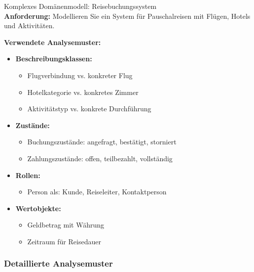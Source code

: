 \begin{example2}{Komplexes Domänenmodell: Reisebuchungssystem}\\
    \small
\textbf{Anforderung:} Modellieren Sie ein System für Pauschalreisen mit Flügen, Hotels und Aktivitäten.

\textbf{Verwendete Analysemuster:}
\begin{itemize}
    \item \textbf{Beschreibungsklassen:}
    \begin{itemize}
        \item Flugverbindung vs. konkreter Flug
        \item Hotelkategorie vs. konkretes Zimmer
        \item Aktivitätstyp vs. konkrete Durchführung
    \end{itemize}
    
    \item \textbf{Zustände:}
    \begin{itemize}
        \item Buchungszustände: angefragt, bestätigt, storniert
        \item Zahlungszustände: offen, teilbezahlt, vollständig
    \end{itemize}
    
    \item \textbf{Rollen:}
    \begin{itemize}
        \item Person als: Kunde, Reiseleiter, Kontaktperson
    \end{itemize}
    
    \item \textbf{Wertobjekte:}
    \begin{itemize}
        \item Geldbetrag mit Währung
        \item Zeitraum für Reisedauer
    \end{itemize}
\end{itemize}
\end{example2}


\columnbreak

\subsubsection{Detaillierte Analysemuster}

